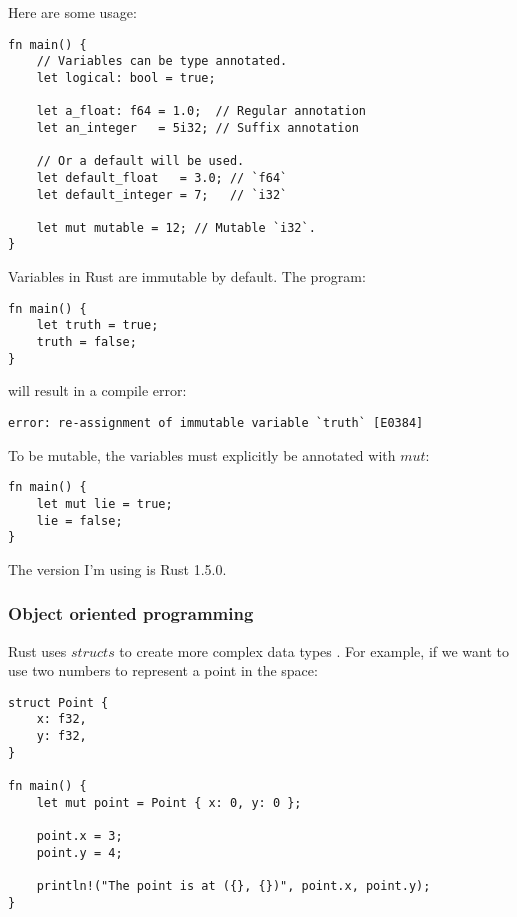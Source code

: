 Here are some usage:

\begin{lstlisting}[label=rst,caption=Rust types usage]
fn main() {
    // Variables can be type annotated.
    let logical: bool = true;

    let a_float: f64 = 1.0;  // Regular annotation
    let an_integer   = 5i32; // Suffix annotation

    // Or a default will be used.
    let default_float   = 3.0; // `f64`
    let default_integer = 7;   // `i32`

    let mut mutable = 12; // Mutable `i32`.
}
\end{lstlisting}

Variables in Rust are immutable by default. The program:

\begin{lstlisting}[label=rmtt,caption=Rust mutability mistake]
fn main() {
    let truth = true;
    truth = false;
}
\end{lstlisting}

will result in a compile error:

\begin{verbatim}
error: re-assignment of immutable variable `truth` [E0384]
\end{verbatim}

To be mutable, the variables must explicitly be annotated with $mut$:

\begin{lstlisting}[label=rmutmtu,caption=Rust mutability]
fn main() {
    let mut lie = true;
    lie = false;
}
\end{lstlisting}

The version I'm using is Rust 1.5.0.

\subsubsection{Object oriented programming}

Rust uses $structs$ to create more complex data types \cite{7_12} \cite{7_13}.
For example, if we want to use two numbers to represent a point in the space:

\begin{lstlisting}[label=rstr,caption=Rust structs]
struct Point {
    x: f32,
    y: f32,
}

fn main() {
    let mut point = Point { x: 0, y: 0 };

    point.x = 3;
    point.y = 4;
    
    println!("The point is at ({}, {})", point.x, point.y);
}
\end{lstlisting}

